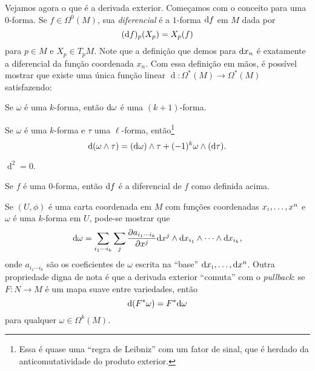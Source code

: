 Vejamos agora o que é a derivada exterior. Começamos com o conceito para uma $0$-forma. Se $f \in \Omega^0(M)$, sua \textit{diferencial} é a $1$-forma ${\operatorname{d}}{f}$ em $M$ dada por
\[
({\operatorname{d}}{f})_p(X_p) = X_p(f)
\]
para $p \in M$ e $X_p \in T_pM$. Note que a definição que demos para ${\operatorname{d}}{x_n}$ é exatamente a diferencial da função coordenada $x_n$. Com essa definição em mãos, é possível mostrar que existe uma única função linear $\operatorname{d}: \Omega^*(M) \longrightarrow \Omega^*(M)$ satisfazendo:
\begin{itroman}
	\item Se $\omega$ é uma $k$-forma, então ${\operatorname{d}}{\omega}$ é uma $(k+1)$-forma.
	\item Se $\omega$ é uma $k$-forma e $\tau$ uma $\ell$-forma, então\footnote{Essa é quase uma ``regra de Leibniz'' com um fator de sinal, que é herdado da anticomutatividade do produto exterior.} 
	\[
	{\operatorname{d}}{(\omega \wedge \tau)} = ({\operatorname{d}}{\omega}) \wedge \tau + (-1)^k \omega \wedge ({\operatorname{d}}{\tau}).
	\]
	\item $\operatorname{d}^2 = 0$.
	\item Se $f$ é uma $0$-forma, então ${\operatorname{d}}{f}$ é a diferencial de $f$ como definida acima.
\end{itroman}
Se $(U,\phi)$ é uma carta coordenada em $M$ com funções coordenadas $\sub x1,\dots,x^n$ e $\omega$ é uma $k$-forma em $U$, pode-se mostrar que
\[
{\operatorname{d}}{\omega} = \sum_{i_1 \dotsb i_k} \sum_j \frac{\partial a_{i_1 \dotsb i_k}}{\partial x^j} {\operatorname{d}}{x^j} \wedge {\operatorname{d}}{x_{i_1}} \wedge \dotsb \wedge {\operatorname{d}}{x_{i_k}},
\]
onde $a_{i_1 \dotsb i_k}$ são os coeficientes de $\omega$ escrita na ``base'' $\de{\sub x1}, \dots, \de{x^n}$. Outra propriedade digna de nota é que a derivada exterior ``comuta'' com o \textit{pullback}: se $F: N \longrightarrow M$ é um mapa suave entre variedades, então
\begin{equation*}
	\label{eq: pullback comuta}
	{\operatorname{d}}{(F^*\omega)} = F^*{\operatorname{d}}{\omega}
\end{equation*}
para qualquer $\omega \in \Omega^k(M)$.


